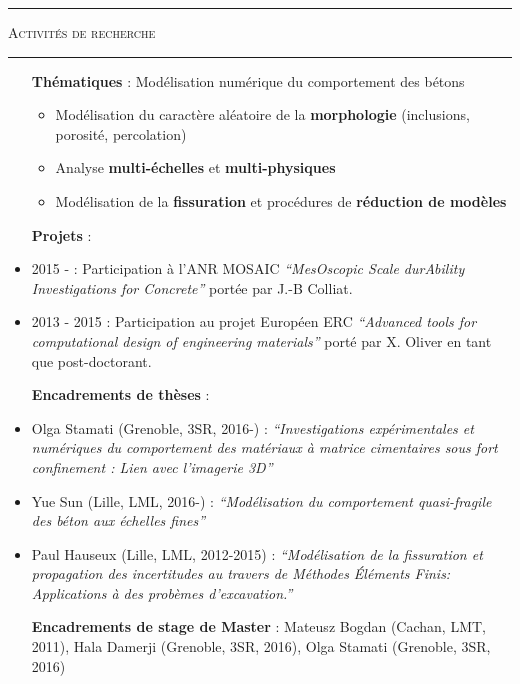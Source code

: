 \documentclass[a4paper,11pt]{article}
\newcommand{\titre}[1]{
  \begin{center}
    \rule{0.4\textwidth}{0.5pt}
    \par\vspace{0.1cm}
    \textsc{\large #1}
    \par\vspace{-0.2cm}
    \par\noindent\rule{0.4\textwidth}{0.5pt}
  \end{center}
}
\begin{document}
\newpage
\titre{Activités de recherche}
\begin{itemize}
  \item[\textbf{Thématiques}] : Modélisation numérique du comportement des bétons
    \begin{itemize}
    \item Modélisation du caractère aléatoire de la \textbf{morphologie} (inclusions, porosité, percolation)
    \item Analyse \textbf{multi-échelles} et \textbf{multi-physiques}
    \item Modélisation de la \textbf{fissuration} et procédures de \textbf{réduction de modèles}
    \end{itemize}
  \item[\textbf{Projets}] :
  \item 2015 - : Participation à l'ANR MOSAIC \textit{``MesOscopic Scale durAbility Investigations for Concrete''} portée par J.-B Colliat.
  \item 2013 - 2015 : Participation au projet Européen ERC \textit{``Advanced tools for computational design of engineering materials''} porté par X. Oliver en tant que post-doctorant.
  \item[\textbf{Encadrements de thèses}] :
  \item Olga Stamati (Grenoble, 3SR, 2016-) : \textit{``Investigations expérimentales et numériques du comportement des matériaux à matrice cimentaires sous fort confinement : Lien avec l'imagerie 3D''}
  \item Yue Sun (Lille, LML, 2016-) : \textit{``Modélisation du comportement quasi-fragile des béton aux échelles fines''}
  \item Paul Hauseux (Lille, LML, 2012-2015) : \textit{``Modélisation de la fissuration et propagation des incertitudes au travers de Méthodes Éléments Finis: Applications à des probèmes d'excavation.''}
  \item[\textbf{Encadrements de stage de Master}] : Mateusz Bogdan (Cachan, LMT, 2011), Hala Damerji (Grenoble, 3SR, 2016), Olga Stamati (Grenoble, 3SR, 2016)

\end{itemize}
\end{document}
